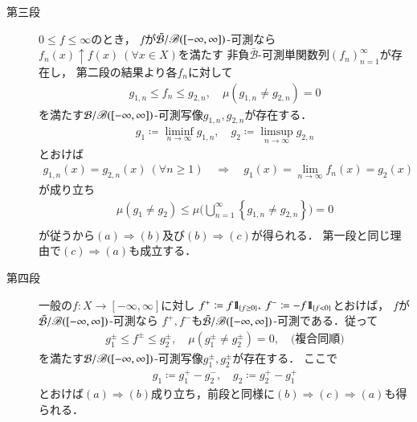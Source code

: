 \begin{prf}
\begin{description}
				\item[第三段]
					$0 \leq f \leq \infty$のとき，
					$f$が$\bar{\mathcal{B}}/\mathscr{B}([-\infty,\infty])$-可測なら
					$f_n(x) \uparrow f(x)\ (\forall x \in X)$を満たす
					非負$\bar{\mathcal{B}}$-可測単関数列$(f_n)_{n=1}^\infty$が存在し，
					第二段の結果より各$f_n$に対して
					\begin{align}
						g_{1,n} \leq f_n \leq g_{2,n},
						\quad \mu\left( g_{1,n} \neq g_{2,n} \right)=0
					\end{align}
					を満たす$\mathcal{B}/\mathscr{B}([-\infty,\infty])$-可測写像$g_{1,n},g_{2,n}$が存在する．
					\begin{align}
						g_1 \coloneqq \liminf_{n \to \infty} g_{1,n},
						\quad g_2 \coloneqq \limsup_{n \to \infty} g_{2,n}
					\end{align}
					とおけば
					\begin{align}
						g_{1,n}(x) = g_{2,n}(x)\ (\forall n \geq 1)
						\quad \Rightarrow \quad g_1(x) = \lim_{n \to \infty} f_n(x) = g_2(x)
					\end{align}
					が成り立ち
					\begin{align}
						\mu(g_1 \neq g_2)
						\leq \mu\Biggl( \bigcup_{n=1}^\infty \left\{g_{1,n} \neq g_{2,n}\right\} \Biggr)=0 \\
					\end{align}
					が従うから$(a) \Rightarrow (b)$及び$(b) \Rightarrow (c)$が得られる．
					第一段と同じ理由で$(c) \Rightarrow (a)$も成立する．
					
				\item[第四段]
					一般の$f:X \longrightarrow [-\infty,\infty]$に対し
					$f^+ \coloneqq f \mbox{1}\hspace{-0.25em}\mbox{l}_{\{f \geq 0\}},\ f^- \coloneqq -f \mbox{1}\hspace{-0.25em}\mbox{l}_{\{f < 0\}}$とおけば，
					$f$が$\bar{\mathcal{B}}/\mathscr{B}([-\infty,\infty])$-可測なら
					$f^+,f^-$も$\bar{\mathcal{B}}/\mathscr{B}([-\infty,\infty])$-可測である．従って
					\begin{align}
						g_1^\pm \leq f^\pm \leq g_2^\pm, \quad \mu\left( g_1^\pm \neq g_2^\pm \right) = 0,
						\quad \mbox{(複合同順)}
					\end{align}
					を満たす$\mathcal{B}/\mathscr{B}([-\infty,\infty])$-可測写像$g_1^{\pm},g_2^{\pm}$が存在する．
					ここで
					\begin{align}
						g_1 \coloneqq g_1^+ - g_2^-,
						\quad g_2 \coloneqq g_2^+ - g_1^+
					\end{align}
					とおけば$(a) \Rightarrow (b)$成り立ち，前段と同様に$(b) \Rightarrow (c) \Rightarrow (a)$も得られる．
					\QED
			\end{description}
		\end{prf}
		
